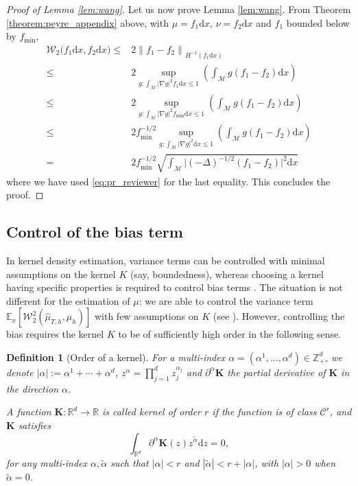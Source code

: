 \documentclass[10pt,a4paper]{article}
\newcommand\cC{\mathcal{C}}
\newcommand\cM{\mathcal{M}}
\newcommand\cW{\mathcal{W}}
\newcommand\W{\mathcal{W}}
\newcommand\dR{\mathbb{R}}
\newcommand\dd{\mathrm{d}}
\newcommand{\ABS}[1]{{{\left| #1 \right|}}} %
\newcommand{\NRM}[1]{{{\left\| #1\right\|}}} %
\newcommand{\PAR}[1]{{{\left(#1\right)}}} %
\newcommand{\SBRA}[1]{{{\left[#1\right]}}} %
\renewcommand{\leq}{\leqslant}
\newtheorem{definition}[theorem]{Definition}
\begin{document}
\begin{proof}[Proof of Lemma \ref{lem:wang}]
Let us now prove Lemma \ref{lem:wang}. From Theorem \ref{theorem:peyre_appendix} above, with $\mu=f_1 \dd x$, $\nu= f_2 \dd x$ and $f_1$ bounded below by $f_{\min}$,
\begin{align*}\cW_2\big(f_1\dd x,f_2\dd x\big)\leq &  2\NRM{f_1-f_2}_{H^{-1}(f_1\dd x)}\\
\leq &  2 \sup_{g:  \int_\cM | \nabla g|^2  f_1 \dd x \le 1} \PAR{ \int_\cM g (f_1-f_2) \dd x}\\
\leq &  2 \sup_{g:  \int_\cM | \nabla g|^2  f_{\min} \dd x \le 1} \PAR{ \int_\cM g (f_1-f_2) \dd x}\\
\leq &  2 f_{\min}^{-1/2} \sup_{g:  \int_\cM | \nabla g|^2   \dd x \le 1} \PAR{  \int_\cM g (f_1-f_2) \dd x}\\
= & 2 f_{\min}^{-1/2} \sqrt{\int_{\cM} \big|(-\Delta)^{-1/2} (f_1-f_2)\big|^2 \dd x}
\end{align*}
where we have used \eqref{eq:pr_reviewer} for the last equality. This concludes the proof.
\end{proof}



\subsection{Control of the bias term}\label{A:bias}
In kernel density estimation, variance terms can be controlled with minimal assumptions on the kernel $K$ (say, boundedness), whereas choosing a kernel having specific properties is required to control  bias terms \cite{Tsybakov2009}. The situation is not different for the estimation of $\mu$: we are able to control the variance term $\mathbb{E}_x\SBRA{\W_2^2(\widehat{\mu}_{T,h},\mu_h)}$ with few assumptions on $K$ (see ). However, controlling the bias requires the kernel $K$ to be of sufficiently high order in the following sense.

\begin{definition}[Order of a kernel]\label{def:kernel}
 For a multi-index  $\alpha =(\alpha^1,...,\alpha^d) \in \mathbb{Z}_{+}^d$, we denote $|\alpha|:=\alpha^1+\cdots+\alpha^d$, $z^\alpha=\prod_{j=1}^dz_j^{\alpha_j}$ 
 and $\partial^\alpha \mathbf{K}$ the partial derivative of $\mathbf{K}$ in the direction $\alpha$.
 
 A function $\mathbf{K}: \mathbb{R}^d \rightarrow \mathbb{R}$ is called kernel of order $r$ if the function is of class $\cC^r$, and   $\mathbf{K}$ satisfies 
	\[
 \int_{\dR^d}\partial^\alpha \mathbf{K}(z)z^{\tilde\alpha}\dd z=0,
    \]
    for any multi-index $\alpha, \tilde\alpha$ such that $ | \alpha | < r$ and $\ABS{\tilde\alpha}<r+| \alpha |$, with $\ABS{\alpha}>0$ when $\tilde\alpha=0$.
\end{definition}
\end{document}
